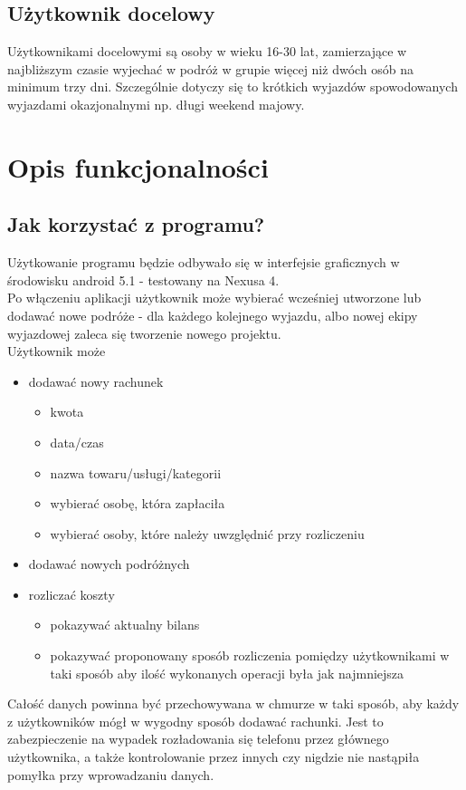 \documentclass[12pt, letterpaper, ]{article}
\begin{document}
	\subsection{Użytkownik docelowy}
		Użytkownikami docelowymi są osoby w wieku 16-30 lat, zamierzające w najbliższym czasie wyjechać w podróż w grupie więcej niż dwóch osób na minimum trzy dni. Szczególnie dotyczy się to krótkich wyjazdów spowodowanych wyjazdami okazjonalnymi np. długi weekend majowy. 
		
	
	\section[Opis funkcjonalności]{Opis funkcjonalności}
	\subsection{Jak korzystać z programu?}
	Użytkowanie programu będzie odbywało się w interfejsie graficznych w środowisku android 5.1 - testowany na Nexusa 4.
	\\
	Po włączeniu aplikacji użytkownik może wybierać wcześniej utworzone lub dodawać nowe podróże - dla każdego kolejnego wyjazdu, albo nowej ekipy wyjazdowej zaleca się tworzenie nowego projektu. 
	\\
	Użytkownik może
	\begin{itemize}
		\item dodawać nowy rachunek
		\begin{itemize}
			\item kwota
			\item data/czas
			\item nazwa towaru/usługi/kategorii
			\item wybierać osobę, która zapłaciła 
			\item wybierać osoby, które należy uwzględnić przy rozliczeniu
		\end{itemize}
		\item dodawać nowych podróżnych
		\item rozliczać koszty
		\begin{itemize}
			\item pokazywać aktualny bilans
			\item pokazywać proponowany sposób rozliczenia pomiędzy użytkownikami w taki sposób aby ilość wykonanych operacji była jak najmniejsza
		\end{itemize}
	\end{itemize}
	
	Całość danych powinna być przechowywana w chmurze w taki sposób, aby każdy z użytkowników mógł w wygodny sposób dodawać rachunki. Jest to zabezpieczenie na wypadek rozładowania się telefonu przez głównego użytkownika, a także kontrolowanie przez innych czy nigdzie nie nastąpiła pomyłka przy wprowadzaniu danych. 
\end{document}
